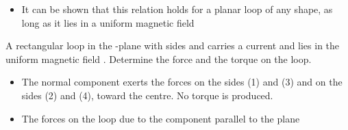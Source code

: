 \begin{ELjoin}

\begin{itemize}
\tightlist
\item
  It can be shown that this relation holds for a planar loop of any shape, as long as it lies in a uniform magnetic field
\end{itemize}


\begin{ELexample}{}

A rectangular loop in the -plane with sides  and  carries a current  and lies in the uniform magnetic field . Determine the force and the torque on the loop.


\begin{ELsolution}


\begin{itemize}
\tightlist
\item
  The normal component exerts the forces  on the sides (1) and (3) and  on the sides (2) and (4), toward the centre. \ELim{\ELto} No torque is produced.
\item
  The forces on the loop due to the component parallel to the plane
\end{itemize}



\end{ELsolution}

\end{ELexample}

\end{ELjoin}
